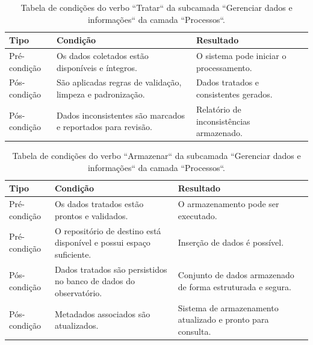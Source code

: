 \begin{apendicesenv}
\begin{table}[H]
\centering
\caption{Tabela de condições do verbo ``Tratar`` da subcamada ``Gerenciar dados e informações`` da camada ``Processos``.}
\begin{tabularx}{\textwidth}{|l|X|X|X|}
\hline
\textbf{Tipo} & \textbf{Condição} & \textbf{Resultado} \\ \hline
Pré-condição & Os dados coletados estão disponíveis e íntegros. & O sistema pode iniciar o processamento.\\ \hline
Pós-condição & São aplicadas regras de validação, limpeza e padronização. & Dados tratados e consistentes gerados.\\ \hline
Pós-condição & Dados inconsistentes são marcados e reportados para revisão. & Relatório de inconsistências armazenado.\\ \hline
\end{tabularx}
\end{table}

\begin{table}[H]
\centering
\caption{Tabela de condições do verbo ``Armazenar`` da subcamada ``Gerenciar dados e informações`` da camada ``Processos``.}
\begin{tabularx}{\textwidth}{|l|X|X|X|}
\hline
\textbf{Tipo} & \textbf{Condição} & \textbf{Resultado} \\ \hline
Pré-condição & Os dados tratados estão prontos e validados. & O armazenamento pode ser executado.\\ \hline
Pré-condição & O repositório de destino está disponível e possui espaço suficiente. & Inserção de dados é possível.\\ \hline
Pós-condição & Dados tratados são persistidos no banco de dados do observatório. & Conjunto de dados armazenado de forma estruturada e segura.\\ \hline
Pós-condição & Metadados associados são atualizados. & Sistema de armazenamento atualizado e pronto para consulta.\\ \hline
\end{tabularx}
\end{table}


\end{apendicesenv}
